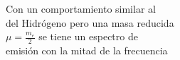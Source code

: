 \documentclass[preview]{standalone}
\begin{document}
\begin{center}
\begin{flushleft}
                      Con un comportamiento similar al \\del Hidrógeno
                      pero una masa reducida \\$\mu = \frac{m_e}{2}$ se 
                      tiene un espectro de \\emisión con la mitad de 
                      la frecuencia
                      \end{flushleft}
\end{center}
\end{document}
